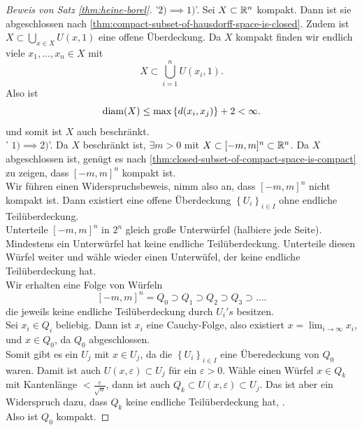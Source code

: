 \begin{proof}[Beweis von Satz \ref{thm:heine-borel}]
    '$2) \implies 1)$'. Sei $X\subset \mathbb{R}^n$ kompakt. Dann ist sie abgeschlossen nach \ref{thm:compact-subset-of-hausdorff-space-is-closed}. Zudem ist $X\subset \bigcup_{x\in X} U(x,1)$ eine offene Überdeckung. Da $X$ kompakt finden wir endlich viele  $x_1,\ldots,x_n\in X$ mit
    \[
        X \subset \bigcup_{i=1}^n U(x_i,1)
    .\] 
    Also ist
    \[
        \operatorname{diam}(X) \leq  \max \left \{d(x_i,x_j)\right\} +2 < \infty
    .\] 
    und somit ist $X$ auch beschränkt. \\
    ' $1)\implies 2)$'. Da $X$ beschränkt ist,  $\exists m>0$ mit $X\subset [-m,m]^n\subset \mathbb{R}^n$. Da $X$ abgeschlossen ist, genügt es nach \ref{thm:closed-subset-of-compact-space-is-compact} zu zeigen, dass  $[-m,m]^n$ kompakt ist. \\
    Wir führen einen Widerspruchsbeweis, nimm also an, dass  $[-m,m]^n$ nicht kompakt ist. Dann existiert eine offene Überdeckung  $\left \{U_i\right\} _{i \in I}$ ohne endliche Teilüberdeckung. \\
    Unterteile $[-m,m]^n$ in  $2^n$ gleich große Unterwürfel (halbiere jede Seite). Mindestens ein Unterwürfel hat keine endliche Teilüberdeckung. Unterteile diesen Würfel weiter und wähle wieder einen Unterwüfel, der keine endliche Teilüberdeckung hat. \\
    Wir erhalten eine Folge von Würfeln
     \[
         [-m,m]^n =     Q_0 \supset Q_1 \supset Q_2 \supset Q_3 \supset \ldots
    .\] 
    die jeweils keine endliche Teilüberdeckung durch $U_i's$ besitzen. \\
    Sei  $x_i \in Q_i$ beliebig. Dann ist $x_i$ eine Cauchy-Folge, also existiert $x = \lim_{i\to \infty} x_i$, und $x\in Q_0$, da $Q_0$ abgeschlossen. \\
    Somit gibt es ein $U_j$ mit  $x\in U_j$, da die $\left \{U_i\right\} _{i \in I}$ eine Überedeckung von $Q_0$ waren. Damit ist auch $U(x,ε) \subset U_j$ für ein $ε>0$. Wähle einen Würfel $x\in Q_k$ mit Kantenlänge $< \frac{ε}{\sqrt{n} }$, dann ist auch $Q_k \subset U(x,ε) \subset U_j$. Das ist aber ein Widerspruch dazu, dass $Q_k$ keine endliche Teilüberdeckung hat, \contra. \\
    Also ist  $Q_0$ kompakt.
\end{proof}

